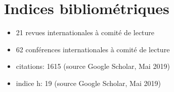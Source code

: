 \section{Indices bibliométriques}
\begin{itemize}
\item 21 revues internationales à comité de lecture
\item 62 conférences internationales à comité de lecture
\item citations: 1615 (source Google Scholar, Mai 2019)
\item indice h: 19 (source Google Scholar, Mai 2019)
\end{itemize}
